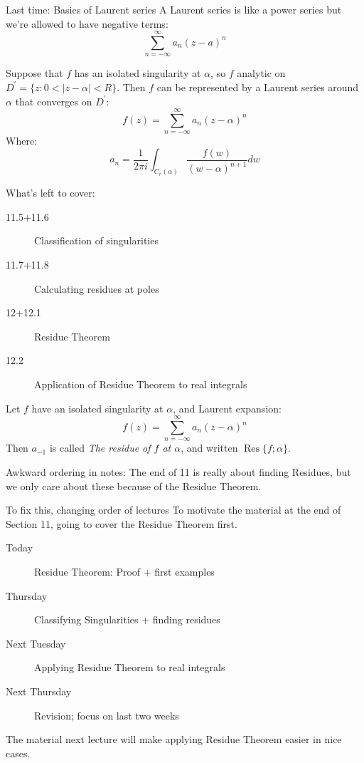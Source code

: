 \documentclass{beamer}
\DeclareMathOperator{\Res}{Res}
\begin{document}
\begin{frame}{Last time: Basics of Laurent series}
A Laurent series is like a power series but we're allowed to have negative terms:
$$\sum_{n=-\infty}^\infty a_n(z-a)^n$$

\begin{theorem} Suppose that $f$ has an isolated singularity at $\alpha$, so $f$ analytic on $D^\prime=\{z: 0< |z-\alpha| < R\}$.  Then $f$ can be represented by a Laurent series around $\alpha$ that converges on $D^\prime$:
$$f(z)=\sum_{n=-\infty}^\infty a_n (z-\alpha)^n$$
Where:
$$a_n=\frac{1}{2\pi i} \int_{C_r(\alpha)} \frac{f(w)}{(w-\alpha)^{n+1}}dw$$
\end{theorem}

\end{frame}

\begin{frame}{What's left to cover:}
\begin{description}
\item[11.5+11.6] Classification of singularities
\item[11.7+11.8] Calculating residues at poles
\item[12+12.1] Residue Theorem
\item[12.2] Application of Residue Theorem to real integrals
\end{description}

\begin{definition}[Residue] Let $f$ have an isolated singularity at $\alpha$, and  Laurent expansion:
$$f(z)=\sum_{n=-\infty}^\infty a_n (z-\alpha)^n$$
Then $a_{-1}$ is called \emph{The residue of $f$ at $\alpha$}, and written $\Res\{f;\alpha\}.$
\end{definition}
\begin{block}{Awkward ordering in notes:}
The end of 11 is really about finding Residues, but we only care about these because of the Residue Theorem.
\end{block}

\end{frame}


\begin{frame}{To fix this, changing order of lectures}
To motivate the material at the end of Section 11, going to cover the Residue Theorem first.

\begin{description}
\item[Today] Residue Theorem: Proof + first examples
\item[Thursday] Classifying Singularities + finding residues
\item[Next Tuesday] Applying Residue Theorem to real integrals
\item[Next Thursday] Revision; focus on last two weeks
\end{description}

The material next lecture will make applying Residue Theorem easier in nice cases.


\end{frame}
\end{document}
